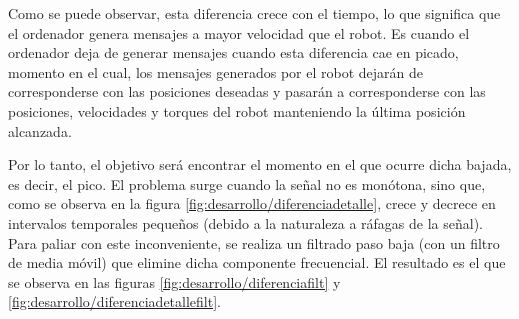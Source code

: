 Como se puede observar, esta diferencia crece con el tiempo, lo que significa que el ordenador genera mensajes a mayor velocidad que el robot. Es cuando el ordenador deja de generar mensajes cuando esta diferencia cae en picado, momento en el cual, los mensajes generados por el robot dejarán de corresponderse con las posiciones deseadas y pasarán a corresponderse con las posiciones, velocidades y torques del robot manteniendo la última posición alcanzada.

Por lo tanto, el objetivo será encontrar el momento en el que ocurre dicha bajada, es decir, el pico. El problema surge cuando la señal no es monótona, sino que, como se observa en la figura \ref{fig:desarrollo/diferenciadetalle}, crece y decrece en intervalos temporales pequeños (debido a la naturaleza a ráfagas de la señal). Para paliar con este inconveniente, se realiza un filtrado paso baja (con un filtro de media móvil) que elimine dicha componente frecuencial. El resultado es el que se observa en las figuras \ref{fig:desarrollo/diferenciafilt} y \ref{fig:desarrollo/diferenciadetallefilt}.

